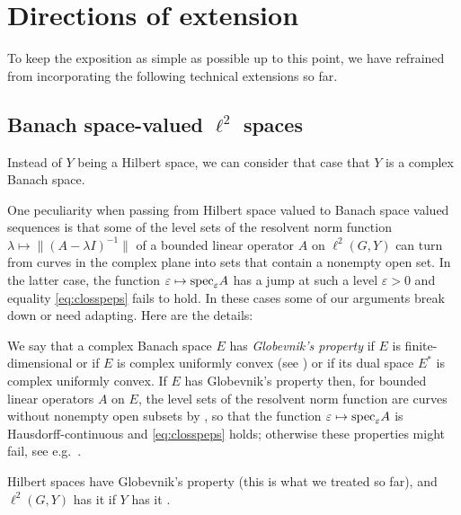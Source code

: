 \documentclass{article}
\newcommand\eps{{\varepsilon}}
\newcommand\speps{{\rm spec}_\eps}
\numberwithin{equation}{section}   %
\numberwithin{figure}{section}  %
\begin{document}
\section{Directions of extension} \label{sec:extensions}
To keep the exposition as simple as possible up to this point, we have refrained from incorporating the following technical extensions so far.

\subsection{Banach space-valued \texorpdfstring{$\ell^2$}{l2} spaces}
\label{subsec:Banach space-valued}
Instead of $Y$ being a Hilbert space, we can consider that case that $Y$ is a complex Banach space.

One peculiarity when passing from Hilbert space valued to Banach space valued sequences is that some of the level sets of the resolvent norm function $\lambda\mapsto \|(A-\lambda I)^{-1}\|$ of a bounded linear operator $A$ on $\ell^2(G,Y)$ can turn from curves in the complex plane into sets that contain a nonempty open set. In the latter case, the function $\eps\mapsto \speps A$ has a jump at such a level $\eps>0$ and equality \eqref{eq:closspeps} fails to hold. In these cases some of our arguments break down or need adapting. Here are the details:

We say that a complex Banach space $E$ has {\sl Globevnik's property} if $E$ is finite-dimensional or if $E$ is complex uniformly convex (see \cite[Definition 2.4(ii)]{Shargo08}) or if its dual space $E^*$ is complex uniformly convex. If $E$ has Globevnik's property then, for bounded linear operators $A$ on $E$, the level sets of the resolvent norm function are curves without nonempty open subsets by \cite{Globevnik74,Globevnik76,Shargo08,Shargo09}, so that the function $\eps\mapsto \speps A$ is Hausdorff-continuous and \eqref{eq:closspeps} holds; otherwise these properties might fail, see e.g.~\cite{Shargo08,Shargo09}. 

Hilbert spaces have Globevnik’s property (this is what we treated so far), and $\ell^2(G,Y)$ has it if $Y$ has it \cite{BoykoKadets}.
\end{document}
